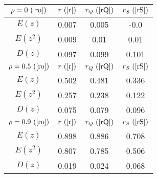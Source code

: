 \begin{tabular}{|c|c|c|c|}
\hline
$\rho = 0~(\ref{ro})$ & $r ~(\ref{r})$ & $r_Q ~(\ref{rQ})$ & $r_S ~(\ref{rS})$\\
\hline
$E(z)$ & 0.007 & 0.005 & -0.0\\
\hline
$E(z^2)$ & 0.009 & 0.01 & 0.01\\
\hline
$D(z)$ & 0.097 & 0.099 & 0.101\\
\hline
$\rho = 0.5~(\ref{ro})$ & $r ~(\ref{r})$ & $r_Q ~(\ref{rQ})$ & $r_S ~(\ref{rS})$\\
\hline
$E(z)$ & 0.502 & 0.481 & 0.336\\
\hline
$E(z^2)$ & 0.257 & 0.238 & 0.122\\
\hline
$D(z)$ & 0.075 & 0.079 & 0.096\\
\hline
$\rho = 0.9~(\ref{ro})$ & $r ~(\ref{r})$ & $r_Q ~(\ref{rQ})$ & $r_S ~(\ref{rS})$\\
\hline
$E(z)$ & 0.898 & 0.886 & 0.708\\
\hline
$E(z^2)$ & 0.807 & 0.785 & 0.506\\
\hline
$D(z)$ & 0.019 & 0.024 & 0.068\\
\hline
\end{tabular}